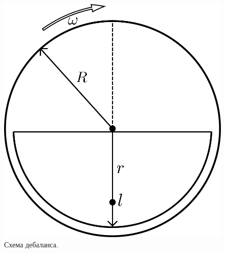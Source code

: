 \documentclass[10pt, pdf, hyperref={unicode}]{beamer}
\begin{document}
\begin{frame}
\begin{center}
\begin{minipage}[h]{0.97\linewidth}
\begin{minipage}[h]{0.36\linewidth}
\begin{figure}[h]
                        \includegraphics[width=1\linewidth]{../img/debalance.png}
                        \caption{Схема дебаланса.}
                    \end{figure}
                \end{minipage}
            \end{minipage}
        \end{center}
    \end{frame}
\end{document}
